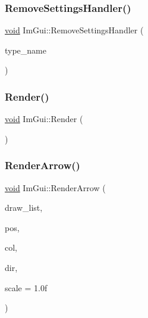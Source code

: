 \mbox{\label{namespaceImGui_a0f06e3a54023d9cbb778f4c7f559da3a}} 
\subsubsection{\texorpdfstring{Remove\+Settings\+Handler()}{RemoveSettingsHandler()}}
{\footnotesize\ttfamily \hyperlink{imgui__impl__opengl3__loader_8h_ac668e7cffd9e2e9cfee428b9b2f34fa7}{void} Im\+Gui\+::\+Remove\+Settings\+Handler (\begin{DoxyParamCaption}\item[{const char $\ast$}]{type\+\_\+name }\end{DoxyParamCaption})}

\mbox{\label{namespaceImGui_ab51a164f547317c16c441f1599e3946d}} 
\subsubsection{\texorpdfstring{Render()}{Render()}}
{\footnotesize\ttfamily \hyperlink{imgui__impl__opengl3__loader_8h_ac668e7cffd9e2e9cfee428b9b2f34fa7}{void} Im\+Gui\+::\+Render (\begin{DoxyParamCaption}{ }\end{DoxyParamCaption})}

\mbox{\label{namespaceImGui_a7ec12551caa737505087c80e38b94937}} 
\subsubsection{\texorpdfstring{Render\+Arrow()}{RenderArrow()}}
{\footnotesize\ttfamily \hyperlink{imgui__impl__opengl3__loader_8h_ac668e7cffd9e2e9cfee428b9b2f34fa7}{void} Im\+Gui\+::\+Render\+Arrow (\begin{DoxyParamCaption}\item[{\hyperlink{structImDrawList}{Im\+Draw\+List} $\ast$}]{draw\+\_\+list,  }\item[{\hyperlink{structImVec2}{Im\+Vec2}}]{pos,  }\item[{Im\+U32}]{col,  }\item[{Im\+Gui\+Dir}]{dir,  }\item[{float}]{scale = {\ttfamily 1.0f} }\end{DoxyParamCaption})}

